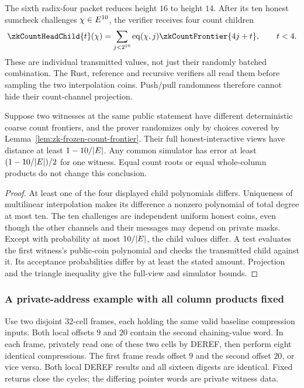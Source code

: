 The sixth radix-four packet reduces height $16$ to height $14$. After its ten honest sumcheck challenges $\chi\in E^{10}$, the verifier receives four count children
\[
 \zkCountHeadChild{t}(\fc)=
 \sum_{j<2^{10}}\eq(\fc,j)\zkCountFrontier{4j+t},
 \qquad t<4.
\]
These are individual transmitted values, not just their randomly batched combination. The Rust, reference and recursive verifiers all read them before sampling the two interpolation coins. Push/pull randomness therefore cannot hide their count-channel projection.

\begin{proposition}\label{prop:zk-frozen-count-head}
Suppose two witnesses at the same public statement have different deterministic coarse count frontiers, and the prover randomizes only by choices covered by Lemma~\ref{lem:zk-frozen-count-frontier}. Their full honest-interactive views have distance at least $1-10/|E|$. Any common simulator has error at least $(1-10/|E|)/2$ for one witness. Equal count roots or equal whole-column products do not change this conclusion.
\end{proposition}
\begin{proof}
At least one of the four displayed child polynomials differs. Uniqueness of multilinear interpolation makes its difference a nonzero polynomial of total degree at most ten. The ten challenges are independent uniform honest coins, even though the other channels and their messages may depend on private masks. Except with probability at most $10/|E|$, the child values differ. A test evaluates the first witness's public-coin polynomial and checks the transmitted child against it. Its acceptance probabilities differ by at least the stated amount. Projection and the triangle inequality give the full-view and simulator bounds.
\end{proof}

\subsubsection{A private-address example with all column products fixed}

Use two disjoint $32$-cell frames, each holding the same valid baseline compression inputs. Both local offsets $9$ and $20$ contain the second chaining-value word. In each frame, privately read one of these two cells by DEREF, then perform eight identical compressions. The first frame reads offset $9$ and the second offset $20$, or vice versa. Both local DEREF results and all sixteen digests are identical. Fixed returns close the cycles; the differing pointer words are private witness data.

